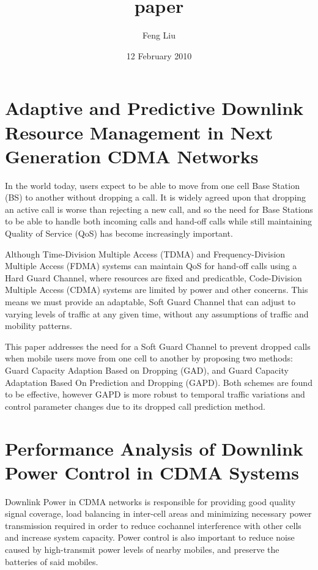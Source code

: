 \documentclass[11pt]{article}
\title{paper}
\author{Feng Liu}
\date{12 February 2010}
\begin{document}

\section{Adaptive and Predictive Downlink Resource Management in Next Generation CDMA Networks}
\label{sec-1}


In the world today, users expect to be able to move from one cell Base
Station (BS) to another without dropping a call. It is widely agreed
upon that dropping an active call is worse than rejecting a new call,
and so the need for Base Stations to be able to handle both incoming
calls and hand-off calls while still maintaining Quality of Service
(QoS) has become increasingly important.

Although Time-Division Multiple Access (TDMA) and Frequency-Division
Multiple Access (FDMA) systems can maintain QoS for hand-off calls
using a Hard Guard Channel, where resources are fixed and predicatble,
Code-Division Multiple Access (CDMA) systems are limited by power and
other concerns. This means we must provide an adaptable, Soft Guard
Channel that can adjust to varying levels of traffic at any given
time, without any assumptions of traffic and mobility patterns.

This paper addresses the need for a Soft Guard Channel to prevent
dropped calls when mobile users move from one cell to another by
proposing two methods: Guard Capacity Adaption Based on Dropping
(GAD), and Guard Capacity Adaptation Based On Prediction and Dropping
(GAPD). Both schemes are found to be effective, however GAPD is more
robust to temporal traffic variations and control parameter changes
due to its dropped call prediction method.


\section{Performance Analysis of Downlink Power Control in CDMA Systems}
\label{sec-2}


Downlink Power in CDMA networks is responsible for providing good
quality signal coverage, load balancing in inter-cell areas and
minimizing necessary power transmission required in order to reduce
cochannel interference with other cells and increase system capacity.
Power control is also important to reduce noise caused by
high-transmit power levels of nearby mobiles, and preserve the
batteries of said mobiles.
\end{document}
